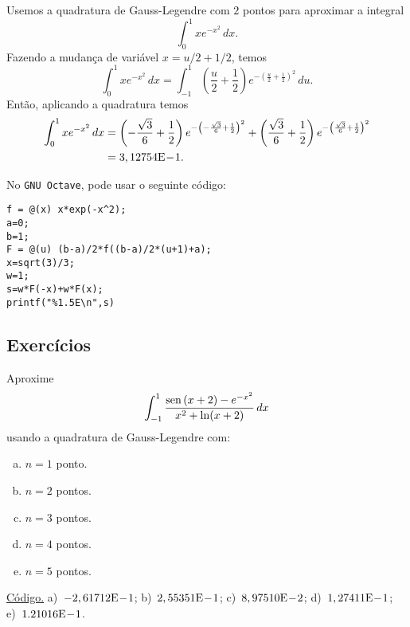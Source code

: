 \begin{ex}
Usemos a quadratura de Gauss-Legendre com $2$ pontos para aproximar a integral
\begin{equation}
  \int_0^{1} xe^{-x^2}\,dx.
\end{equation}
Fazendo a mudança de variável $x=u/2 + 1/2$, temos
\begin{equation}
  \int_0^{1} xe^{-x^2}\,dx = \int_{-1}^1 \left(\frac{u}{2}+\frac{1}{2}\right)e^{-\left(\frac{u}{2}+\frac{1}{2}\right)^2}\,du.
\end{equation}
Então, aplicando a quadratura temos
\begin{align}
  \int_0^{1} xe^{-x^2}\,dx &= \left(-\frac{\sqrt{3}}{6}+\frac{1}{2}\right)e^{-\left(-\frac{\sqrt{3}}{6}+\frac{1}{2}\right)^2} + \left(\frac{\sqrt{3}}{6}+\frac{1}{2}\right)e^{-\left(\frac{\sqrt{3}}{6}+\frac{1}{2}\right)^2} \\
  &= 3,12754\mathrm{E}\!-\!1.
\end{align}

\ifisoctave
No \verb+GNU Octave+, pode usar o seguinte código:
\begin{verbatim}
f = @(x) x*exp(-x^2);
a=0;
b=1;
F = @(u) (b-a)/2*f((b-a)/2*(u+1)+a);
x=sqrt(3)/3;
w=1;
s=w*F(-x)+w*F(x);
printf("%1.5E\n",s)
\end{verbatim}
\fi
\end{ex}

\subsection*{Exercícios}

\begin{exer}\label{exer:GL_fun}
  Aproxime
  \begin{equation}
    \int_{-1}^1 \frac{\operatorname{sen}\,(x+2)-e^{-x^2}}{x^2+\ln(x+2)}\,dx
  \end{equation}
usando a quadratura de Gauss-Legendre com:
\begin{enumerate}[a)]
\item $n=1$ ponto.
\item $n=2$ pontos.
\item $n=3$ pontos.
\item $n=4$ pontos.
\item $n=5$ pontos.
\end{enumerate}
\end{exer}
\begin{resp}
  \ifisoctave 
  \href{https://github.com/phkonzen/notas/blob/master/src/MatematicaNumerica/cap_integr/dados/exer_GL_fun/exer_GL_fun.m}{Código.} 
  \fi
  a)~$-2,61712\mathrm{E}\!-\!1$; b)~$2,55351\mathrm{E}\!-\!1$; c)~$8,97510\mathrm{E}\!-\!2$; d)~$1,27411\mathrm{E}\!-\!1$; e)~$1.21016\mathrm{E}\!-\!1$.
\end{resp}

